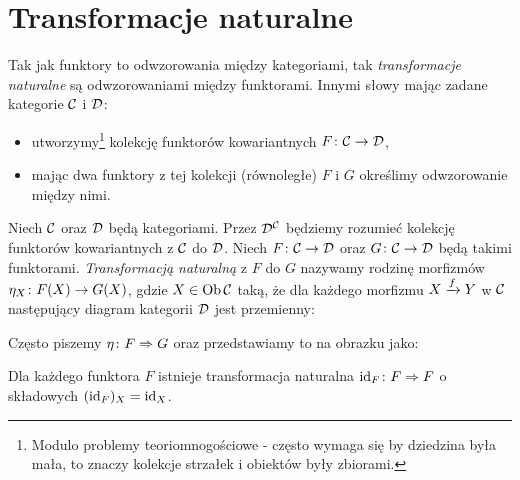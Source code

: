 \section{Transformacje naturalne}
\begin{idea}
  Tak jak funktory to odwzorowania między kategoriami, tak \emph{transformacje naturalne} są odwzorowaniami między funktorami. Innymi słowy mając zadane kategorie $\C$ i $\D$:
  \begin{itemize}
    \item utworzymy\footnote{Modulo problemy teoriomnogościowe - często wymaga się by dziedzina była mała, to znaczy kolekcje strzałek i obiektów były zbiorami.} kolekcję funktorów kowariantnych $\morph F\C\D$,
    \item mając dwa funktory z tej kolekcji (równoległe) $F$ i $G$ określimy odwzorowanie między nimi.
  \end{itemize}
\end{idea}

\begin{defn}
  Niech $\C$ oraz $\D$ będą kategoriami. Przez $\D^\C$ będziemy rozumieć kolekcję funktorów kowariantnych z $\C$ do $\D$.
  Niech $\morph F\C\D$ oraz $\morph G\C\D$ będą takimi funktorami. \emph{Transformacją naturalną} z $F$ do $G$ nazywamy rodzinę morfizmów $\morph{\eta_X}{F(X)}{G(X)}$, gdzie $X\in \Ob\C$ taką, że dla każdego morfizmu $\morpharr fXY$ w $\C$ następujący diagram kategorii $\D$ jest przemienny:
  \begin{center}
  \end{center}
  Często piszemy $\nattran \eta FG$ oraz przedstawiamy to na obrazku jako:
  \begin{center}
  \end{center}
\end{defn}

\begin{exmp}
  \label{exmp:transf_ident}
  Dla każdego funktora $F$ istnieje transformacja naturalna $\nattran{\id F}FF$ o składowych $(\id F)_X=\id X$.
\end{exmp}


